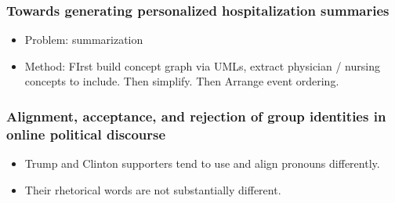 \subsubsection{\cite{Acharya2018Towards} Towards generating personalized hospitalization summaries}
\begin{itemize}
	\item Problem: summarization
	\item Method: FIrst build concept graph via UMLs, extract physician / nursing concepts to include. Then simplify. Then Arrange event ordering.
\end{itemize}

\subsubsection{\cite{Shin2018Alignment} Alignment, acceptance, and rejection of group identities in online political discourse}
\begin{itemize}
	\item Trump and Clinton supporters tend to use and align pronouns differently.
	\item Their rhetorical words are not substantially different.
\end{itemize}